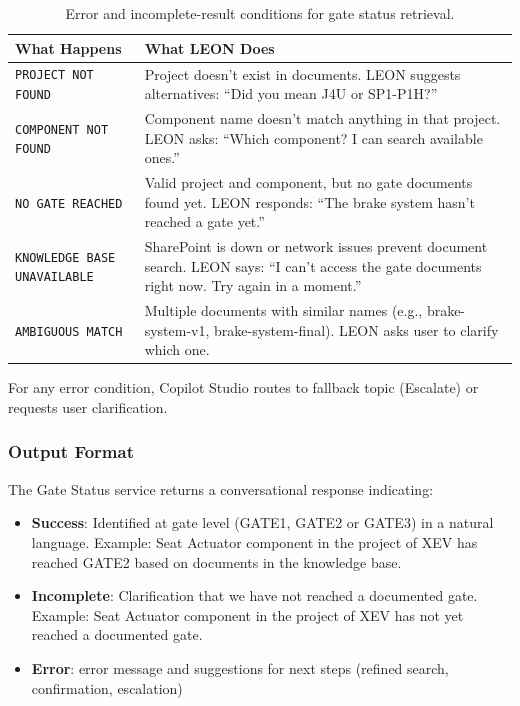 \begin{table}[H]
\centering
\footnotesize
\caption{Error and incomplete-result conditions for gate status retrieval.}
\label{tab:gate-status-errors}
\begin{tabularx}{0.95\textwidth}{|>{\raggedright\arraybackslash}p{3.2cm}|X|}
    \hline
    \rowcolor[HTML]{E6F2FF}\textcolor[HTML]{003D99}{\textbf{What Happens}} & \textcolor[HTML]{003D99}{\textbf{What LEON Does}} \\
    \hline
    \texttt{PROJECT NOT FOUND} & Project doesn't exist in documents. LEON suggests alternatives: ``Did you mean J4U or SP1-P1H?'' \\
    \hline
    \texttt{COMPONENT NOT FOUND} & Component name doesn't match anything in that project. LEON asks: ``Which component? I can search available ones.'' \\
    \hline
    \texttt{NO GATE REACHED} & Valid project and component, but no gate documents found yet. LEON responds: ``The brake system hasn't reached a gate yet.'' \\
    \hline
    \texttt{KNOWLEDGE BASE UNAVAILABLE} & SharePoint is down or network issues prevent document search. LEON says: ``I can't access the gate documents right now. Try again in a moment.'' \\
    \hline
    \texttt{AMBIGUOUS MATCH} & Multiple documents with similar names (e.g., brake-system-v1, brake-system-final). LEON asks user to clarify which one. \\
    \hline
\end{tabularx}
\end{table}

\vspace{0.2cm}

\noindent For any error condition, Copilot Studio routes to fallback topic (Escalate) or requests user clarification.

\subsubsection{\textcolor[HTML]{0066CC}{Output Format}}

The Gate Status service returns a conversational response indicating:

\begin{itemize}
    \item[\quad\textbullet] \textbf{Success}: Identified at gate level (GATE1, GATE2 or GATE3) in a natural language. Example: Seat Actuator component in the project of XEV has reached GATE2 based on documents in the knowledge base.
    \item[\quad\textbullet] \textbf{Incomplete}: Clarification that we have not reached a documented gate. Example: Seat Actuator component in the project of XEV has not yet reached a documented gate.
    \item[\quad\textbullet] \textbf{Error}: error message and suggestions for next steps (refined search, confirmation, escalation)
\end{itemize}

